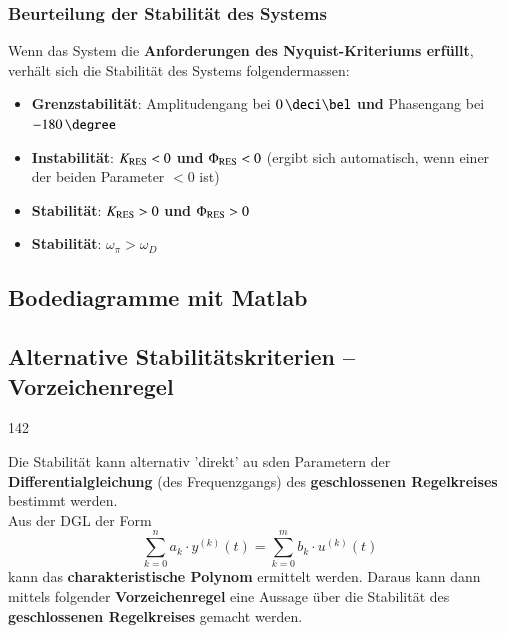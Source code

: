 \subsubsection{Beurteilung der Stabilität des Systems}

Wenn das System die \textbf{Anforderungen des Nyquist-Kriteriums erfüllt}, verhält sich die Stabilität des Systems folgendermassen:

\begin{itemize}
    \item \textbf{Grenzstabilität}: Amplitudengang bei $0 \, \deci \bel$ \textbf{und} Phasengang bei $-180 \, \degree$
    \item \textbf{Instabilität}:  $K_{\rm RES} < 0$ \textbf{und} $\Phi_{\rm RES} < 0$ (ergibt sich automatisch, wenn einer der 
        beiden Parameter $< 0$ ist)
    \item \textbf{Stabilität}: $K_{\rm RES} > 0$ \textbf{und} $\Phi_{\rm RES} > 0$ 
    \item \textbf{Stabilität}: $\omega_{\pi} > \omega_D$  %
\end{itemize}


\subsection{Bodediagramme mit Matlab}




\subsection{Alternative Stabilitätskriterien -- Vorzeichenregel}{142}

Die Stabilität kann alternativ 'direkt' au sden Parametern der \textbf{Differentialgleichung} (des
Frequenzgangs) des \textbf{geschlossenen Regelkreises} bestimmt werden.\\
Aus der DGL der Form
$$ \sum\limits_{k=0}^n a_k \cdot y^{(k)}(t) = \sum\limits_{k=0}^m b_k \cdot u^{(k)}(t) $$
kann das \textbf{charakteristische Polynom} ermittelt werden. Daraus kann dann mittels 
folgender \textbf{Vorzeichenregel} eine Aussage über die Stabilität des \textbf{geschlossenen Regelkreises} 
gemacht werden.

